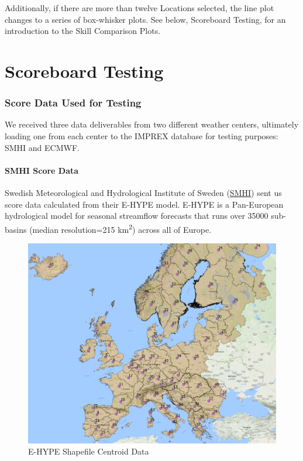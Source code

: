 \documentclass[logos,parttoc,morelanguage=french,morelanguage=german]{orsay-memoire}
\begin{document}
Additionally, if there are more than twelve Locations selected, the line plot changes to a series of box-whisker plots. See below, Scoreboard Testing, for an introduction to the Skill Comparison Plots.

\part{Scoreboard Testing}

\section{Score Data Used for Testing}

We received three data deliverables from two different weather centers, ultimately loading one from each center to the IMPREX database for testing purposes: SMHI and ECMWF.

\subsection{SMHI Score Data}

Swedish Meteorological and Hydrological Institute of Sweden (\href{http://www.smhi.se/en}{SMHI}) sent us score data calculated from their E-HYPE model. E-HYPE is a Pan-European hydrological model for seasonal streamflow forecasts that runs over 35000 sub-basins (median resolution=215 km\textsuperscript{2}) across all of Europe.

\begin{figure}[H]
\centering
\includegraphics[width=0.8\linewidth]{images/gisEHYPEcentroids.png}
  \caption{E-HYPE Shapefile Centroid Data}
  \label{fig:EHYPEdata}
\end{figure}
\end{document}
